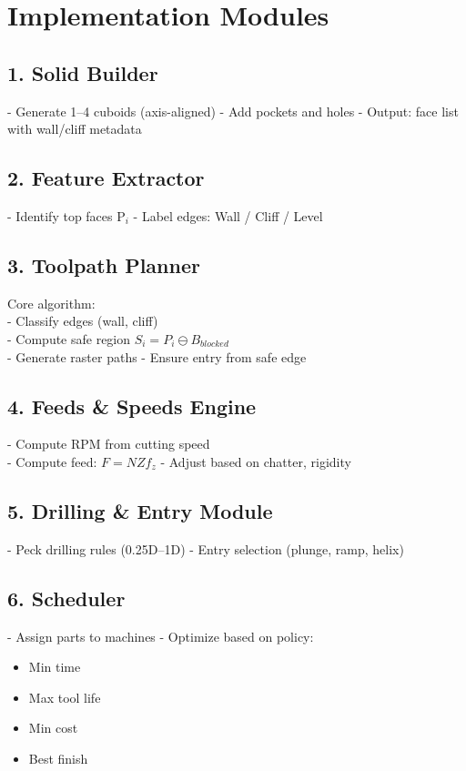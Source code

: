 \documentclass{article}
\begin{document}
\section{Implementation Modules}

\subsection{1. Solid Builder}
- Generate 1--4 cuboids (axis-aligned)
- Add pockets and holes
- Output: face list with wall/cliff metadata

\subsection{2. Feature Extractor}
- Identify top faces P$_i$
- Label edges: Wall / Cliff / Level

\subsection{3. Toolpath Planner}
Core algorithm:\\
- Classify edges (wall, cliff) \cite{toolpath} \\
- Compute safe region $S_i = P_i \ominus B_{blocked}$ \cite{toolpath} \\
- Generate raster paths
- Ensure entry from safe edge

\subsection{4. Feeds \& Speeds Engine}
- Compute RPM from cutting speed \cite{feeds} \\
- Compute feed: $F = N Z f_z$ \cite{feeds}
- Adjust based on chatter, rigidity

\subsection{5. Drilling \& Entry Module}
- Peck drilling rules (0.25D--1D) \cite{feeds}
- Entry selection (plunge, ramp, helix)

\subsection{6. Scheduler}
- Assign parts to machines
- Optimize based on policy:
\begin{itemize}
\item Min time
\item Max tool life
\item Min cost
\item Best finish
\end{itemize}
\end{document}
